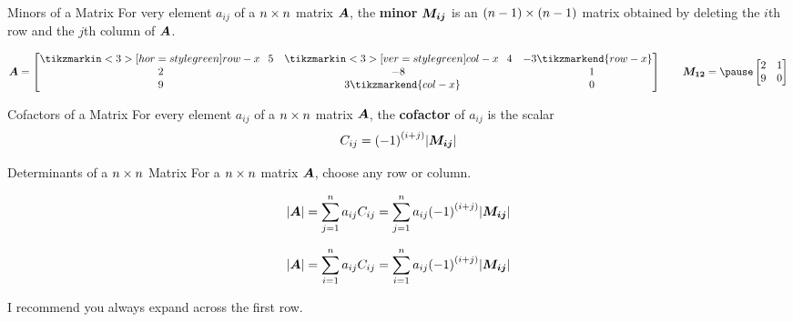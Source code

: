 \documentclass{beamer}
\begin{document}
\begin{frame}
\begin{block}{Minors of a Matrix}
For very element $a_{ij}$ of a $n \times n$ matrix $\boldsymbol{A}$, the \textbf{minor} $\boldsymbol{M_{ij}}$ is an $(n-1) \times (n-1)$ matrix obtained by deleting the $i$th row and the $j$th column of $\boldsymbol{A}$.
\end{block}\pause
\begin{example}
\begin{equation*}
\mat{A}=
\begin{bmatrix}
	\tikzmarkin<3>[hor=style green]{row-x}\+5 & \tikzmarkin<3>[ver=style green]{col-x}\+4 &  -3\tikzmarkend{row-x}\\
	\+2 &  -8 & \+1\\
	\+9 & \+3\tikzmarkend{col-x} & \+0\\
\end{bmatrix}
\qquad
\mat{M_{12}}=\pause
\begin{bmatrix}
		2 & 1\\
		9 & 0\\
\end{bmatrix}
\end{equation*}
\end{example}\pause
\begin{block}{Cofactors of a Matrix}
For every element $a_{ij}$ of a $n \times n$ matrix $\boldsymbol{A}$, the \textbf{cofactor} of $a_{ij}$ is the scalar
\begin{equation*}
C_{ij}={(-1)}^{(i+j)}{\left\lvert \boldsymbol{M_{ij}}\right\rvert}
\end{equation*}
\end{block}
\end{frame}

\begin{frame}
\begin{block}{Determinants of a $n \times n$ Matrix}
For a $n \times n$ matrix $\boldsymbol{A}$, choose any row or column.
\begin{description}
\item<2->[\textbf{Expansion by the $\boldsymbol{i}$th row:}]
\begin{equation*}
{\left\lvert \boldsymbol{A}\right\rvert} = \sum_{j=1}^{n} a_{ij}C_{ij}
              = \sum_{j=1}^{n} a_{ij}{(-1)}^{(i+j)}{\left\lvert \boldsymbol{M_{ij}}\right\rvert}
\end{equation*}
\item<3->[\textbf{Expansion by the $\boldsymbol{j}$th column:}]
\begin{equation*}
{\left\lvert \boldsymbol{A}\right\rvert} = \sum_{i=1}^{n} a_{ij}C_{ij}
              = \sum_{i=1}^{n} a_{ij}{(-1)}^{(i+j)}{\left\lvert \boldsymbol{M_{ij}}\right\rvert}
\end{equation*}
\end{description}
I recommend you always expand across the first row.
\end{block}
\end{frame}
\end{document}
